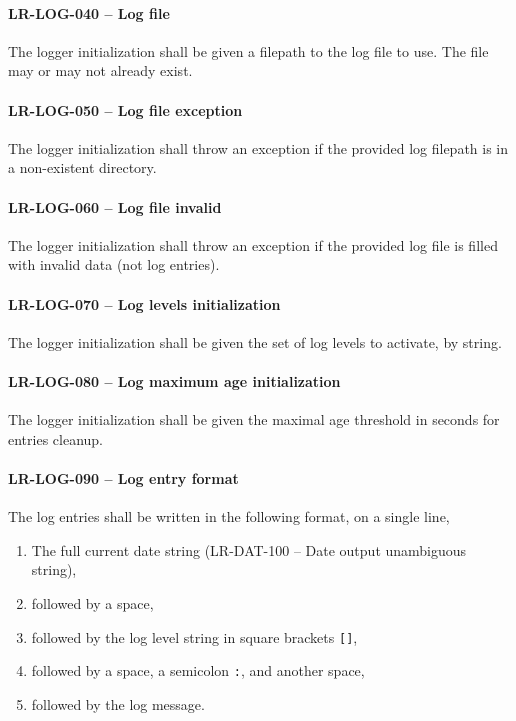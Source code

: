 \paragraph{LR-LOG-040 -- Log file}
The logger initialization shall be given a filepath to the log file
to use. The file may or may not already exist.

\paragraph{LR-LOG-050 -- Log file exception}
The logger initialization shall throw an exception if the provided
log filepath is in a non-existent directory.

\paragraph{LR-LOG-060 -- Log file invalid}
The logger initialization shall throw an exception if the provided
log file is filled with invalid data (not log entries).

\paragraph{LR-LOG-070 -- Log levels initialization}
The logger initialization shall be given the set of log levels
to activate, by string.

\paragraph{LR-LOG-080 -- Log maximum age initialization}
The logger initialization shall be given the maximal age threshold
in seconds for entries cleanup.

\paragraph{LR-LOG-090 -- Log entry format}
The log entries shall be written in the following format,
on a single line,
\begin{enumerate}
\item The full current date string (LR-DAT-100 -- Date output unambiguous
  string),
\item followed by a space,
\item followed by the log level string in square brackets \lstinline{[]},
\item followed by a space, a semicolon \lstinline{:}, and another
  space,
\item followed by the log message.
\end{enumerate}

